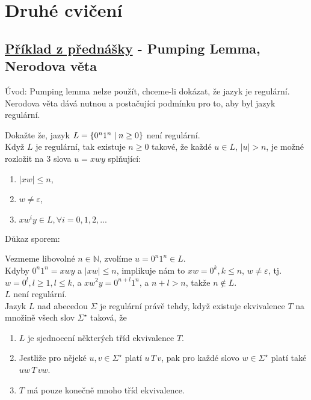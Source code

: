 \section{Druhé cvičení}

\subsection{\href{https://youtu.be/agNAMdc8zYY?list=PLQL6z4JeTTQkLuzI78OTnfYBclE1g0UjS&t=778}{Příklad z přednášky} - Pumping Lemma, Nerodova věta}
Úvod: Pumping lemma nelze použít, chceme-li dokázat, že jazyk je regulární. Nerodova věta dává nutnou a postačující 
podmínku pro to, aby byl jazyk regulární. 

Dokažte že, jazyk $L = \left\lbrace 0^n 1^n \mid n \geq 0 \right\rbrace$ není regulární.\\ 

Když $L$ je regulární, tak existuje $n \geq 0$ takové, že každé ${u \in L}$,
$|u| > n$, je možné rozložit na 3 slova $u = xwy$ splňující:

\begin{enumerate}[1), noitemsep]
    \item $|xw| \leq n$,
    \item $w \not= \varepsilon$,
    \item $xw^i y \in L, \forall i = 0, 1, 2, ...$
\end{enumerate}

Důkaz sporem: 

Vezmeme libovolné $n \in \mathbb{N}$, zvolíme $u = 0^n1^n \in L$.\\
Kdyby $0^n1^n = xwy$ a $|xw| \leq n$, implikuje nám 
to $xw=0^k, k \leq n$, $w \neq \varepsilon$, tj. $w = 0^l, l \geq 1, l \leq k$, a $xw^2y = 0^{n+l} 1^n$, a $n+l > n$, 
takže $n \notin L$.\\
$L$ není regulární.\\

 Jazyk $L$ nad abecedou $\Sigma$ je regulární právě tehdy, když existuje ekvivalence $T$ na množině 
všech slov $\Sigma^{\star}$ taková, že 
\begin{enumerate}[1), noitemsep]
    \item $L$ je sjednocení některých tříd ekvivalence $T$. 
    \item Jestliže pro nějeké $u, v \in \Sigma^{\star}$ platí $u \, T \, v$, pak pro každé slovo $w \in \Sigma^{\star}$ platí také $uw\, T\, vw$. 
    \item $T$ má pouze konečně mnoho tříd ekvivalence. 
\end{enumerate}

